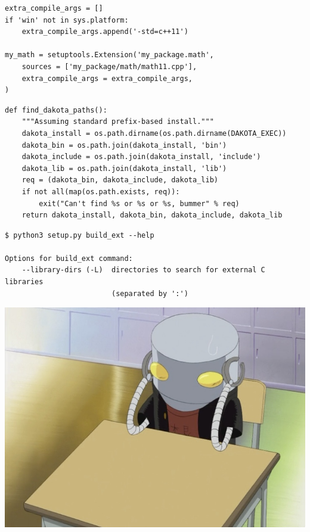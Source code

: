 \documentclass[pdf]{beamer}
\begin{document}
\begin{frame}[fragile]
    \begin{verbatim}
extra_compile_args = []
if 'win' not in sys.platform:
    extra_compile_args.append('-std=c++11')

my_math = setuptools.Extension('my_package.math',
    sources = ['my_package/math/math11.cpp'],
    extra_compile_args = extra_compile_args,
)
    \end{verbatim}
\end{frame}

\begin{frame}[fragile]
    \begin{verbatim}
def find_dakota_paths():
    """Assuming standard prefix-based install."""
    dakota_install = os.path.dirname(os.path.dirname(DAKOTA_EXEC))
    dakota_bin = os.path.join(dakota_install, 'bin')
    dakota_include = os.path.join(dakota_install, 'include')
    dakota_lib = os.path.join(dakota_install, 'lib')
    req = (dakota_bin, dakota_include, dakota_lib)
    if not all(map(os.path.exists, req)):
        exit("Can't find %s or %s or %s, bummer" % req)
    return dakota_install, dakota_bin, dakota_include, dakota_lib
    \end{verbatim}
\end{frame}

\begin{frame}[fragile]
    \begin{verbatim}
$ python3 setup.py build_ext --help

Options for build_ext command:
    --library-dirs (-L)  directories to search for external C libraries
                         (separated by ':')
    \end{verbatim}
\end{frame}

\begin{frame}
    \begin{center}
        \includegraphics[height = 0.8\textheight]{img/mechazawa-sad.jpg}
    \end{center}
\end{frame}
\end{document}
